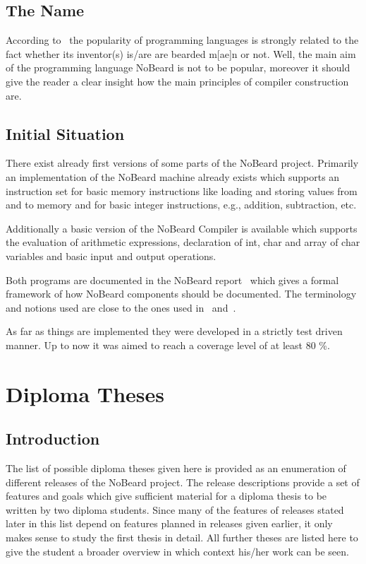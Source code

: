 \documentclass[11pt]{article}
\begin{document}
\subsection{The Name}
According to~\cite{khason_computer_2008} the popularity of programming languages is strongly related to the fact whether its inventor(s) is/are are bearded m[ae]n or not. Well, the main aim of the programming language NoBeard is not to be popular,
moreover it should give the reader a clear insight how the main principles of compiler construction are.

\subsection{Initial Situation}\label{sec:initial_situation}
There exist already first versions of some parts of the NoBeard project. Primarily an implementation of the NoBeard machine already exists which supports an instruction set for basic memory instructions like loading and storing values from and to memory and for basic integer instructions, e.g., addition, subtraction, etc.

Additionally a basic version of the NoBeard Compiler is available which supports the evaluation of arithmetic expressions, declaration of int, char and array of char variables and basic input and output operations.

Both programs are documented in the NoBeard report~\cite{bauer_nobeard_2015} which gives a formal framework of how NoBeard components should be documented. The terminology and notions used are close to the ones used in~\cite{wirth_compiler_1996} and~\cite{aho_compilers:_2006}.

As far as things are implemented they were developed in a strictly test driven manner. Up to now it was aimed to reach a coverage level of at least 80 \%.

\section{Diploma Theses}
\subsection{Introduction}
The list of possible diploma theses given here is provided as an enumeration of different releases of the NoBeard project. The release descriptions provide a set of features and goals which give sufficient material for a diploma thesis to be written by two diploma students. Since many of the features of releases stated later in this list depend on features planned in releases given earlier, it only makes sense to study the first thesis in detail. All further theses are listed here to give the student a broader overview in which context his/her work can be seen.
\end{document}

